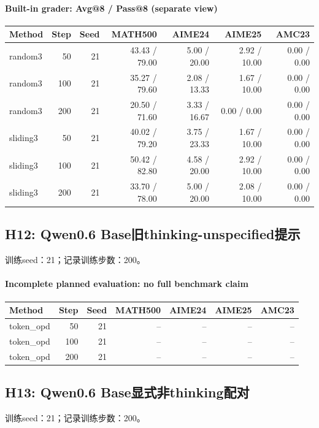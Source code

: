 \paragraph{Built-in grader: Avg@8 / Pass@8 (separate view)}
{\footnotesize\setlength{\tabcolsep}{3.5pt}
\begin{longtable}{@{}p{1.4in}rrrrrr@{}}
\toprule
Method & Step & Seed & MATH500 & AIME24 & AIME25 & AMC23 \\
\midrule\endhead
random3 & 50 & 21 & 43.43 / 79.00 & 5.00 / 20.00 & 2.92 / 10.00 & 0.00 / 0.00 \\
random3 & 100 & 21 & 35.27 / 79.60 & 2.08 / 13.33 & 1.67 / 10.00 & 0.00 / 0.00 \\
random3 & 200 & 21 & 20.50 / 71.60 & 3.33 / 16.67 & 0.00 / 0.00 & 0.00 / 0.00 \\
sliding3 & 50 & 21 & 40.02 / 79.20 & 3.75 / 23.33 & 1.67 / 10.00 & 0.00 / 0.00 \\
sliding3 & 100 & 21 & 50.42 / 82.80 & 4.58 / 20.00 & 2.92 / 10.00 & 0.00 / 0.00 \\
sliding3 & 200 & 21 & 33.70 / 78.00 & 5.00 / 20.00 & 2.08 / 10.00 & 0.00 / 0.00 \\
\bottomrule\end{longtable}
}
\subsection{H12: Qwen0.6 Base旧thinking-unspecified提示}
\label{history:qwen06_old_prompt}
训练seed：21；记录训练步数：200。
\paragraph{Incomplete planned evaluation: no full benchmark claim}
{\footnotesize\setlength{\tabcolsep}{3.5pt}
\begin{longtable}{@{}p{1.4in}rrrrrr@{}}
\toprule
Method & Step & Seed & MATH500 & AIME24 & AIME25 & AMC23 \\
\midrule\endhead
token\_\allowbreak{}opd & 50 & 21 & -- & -- & -- & -- \\
token\_\allowbreak{}opd & 100 & 21 & -- & -- & -- & -- \\
token\_\allowbreak{}opd & 200 & 21 & -- & -- & -- & -- \\
\bottomrule\end{longtable}
}
\subsection{H13: Qwen0.6 Base显式非thinking配对}
\label{history:qwen06_nonthinking}
训练seed：21；记录训练步数：200。
